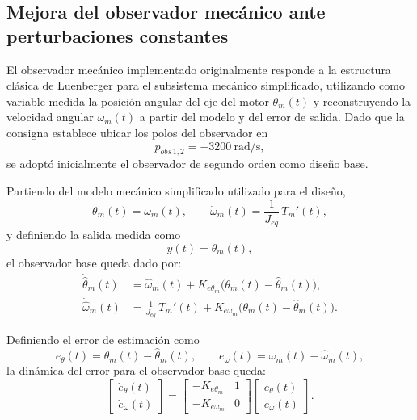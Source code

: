\documentclass[12pt, a4paper,journal, onecolumn, compsoc]{IEEEtran}
\begin{document}
\subsection{Mejora del observador mecánico ante perturbaciones constantes}

El observador mecánico implementado originalmente responde a la estructura clásica de Luenberger para el subsistema mecánico simplificado, utilizando como variable medida la posición angular del eje del motor $\theta_m(t)$ y reconstruyendo la velocidad angular $\omega_m(t)$ a partir del modelo y del error de salida. Dado que la consigna establece ubicar los polos del observador en
\[
p_{obs\,1,2}=-3200\ \text{rad/s},
\]
se adoptó inicialmente el observador de segundo orden como diseño base.

Partiendo del modelo mecánico simplificado utilizado para el diseño,
\begin{equation}
\dot{\theta}_m(t)=\omega_m(t), 
\qquad
\dot{\omega}_m(t)=\frac{1}{J_{eq}}\,T_m'(t),
\end{equation}
y definiendo la salida medida como
\begin{equation}
y(t)=\theta_m(t),
\end{equation}
el observador base queda dado por:
\begin{equation}
\label{eq:obs_base}
\begin{aligned}
    \dot{\hat{\theta}}_m(t) &= \hat{\omega}_m(t) + K_{e\theta_m}\big(\theta_m(t)-\hat{\theta}_m(t)\big), \\
    \dot{\hat{\omega}}_m(t) &= \frac{1}{J_{eq}}\,T_m'(t) + K_{e\omega_m}\big(\theta_m(t)-\hat{\theta}_m(t)\big).
\end{aligned}
\end{equation}

Definiendo el error de estimación como
\begin{equation}
e_\theta(t)=\theta_m(t)-\hat{\theta}_m(t),
\qquad
e_\omega(t)=\omega_m(t)-\hat{\omega}_m(t),
\end{equation}
la dinámica del error para el observador base queda:
\begin{equation}
\begin{bmatrix}
\dot e_\theta(t)\\
\dot e_\omega(t)
\end{bmatrix}
=
\begin{bmatrix}
-K_{e\theta_m} & 1\\
-K_{e\omega_m} & 0
\end{bmatrix}
\begin{bmatrix}
e_\theta(t)\\
e_\omega(t)
\end{bmatrix}.
\end{equation}
\end{document}
